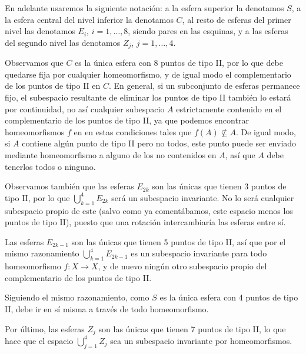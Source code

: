 \documentclass[twoside]{article}
\begin{document}
\begin{solucion}
En adelante usaremos la siguiente notación: a la esfera superior la denotamos $S$, a la esfera central del nivel inferior la denotamos $C$, al resto de esferas del primer nivel las denotamos $E_i$, $i=1,\dots, 8$, siendo pares en las esquinas, y a las esferas del segundo nivel las denotamos $Z_j$, $j=1,\dots, 4$. 

Observamos que $C$ es la única esfera con 8 puntos de tipo II, por lo que debe quedarse fija por cualquier homeomorfismo, y de igual modo el complementario de los puntos de tipo II en $C$. En general, si un subconjunto de esferas permanece fijo, el subespacio resultante de eliminar los puntos de tipo II también lo estará por continuidad, no así cualquier subespacio $A$ estrictamente contenido en el complementario de los puntos de tipo II, ya que podemos encontrar homeomorfismos $f$ en en estas condiciones tales que $f(A)\not\subseteq A$. De igual modo, si $A$ contiene algún punto de tipo II pero no todos, este punto puede ser enviado mediante homeomorfismo a alguno de los no contenidos en $A$, así que $A$ debe tenerlos todos o ninguno. 

Observamos también que las esferas $E_{2k}$ son las únicas que tienen 3 puntos de tipo II, por lo que $\bigcup_{k=1}^4E_{2k}$ será un subespacio invariante. No lo será cualquier subespacio propio de este (salvo como ya comentábamos, este espacio menos los puntos de tipo II), puesto que una rotación intercambiaría las esferas entre sí. 

Las esferas $E_{2k-1}$ son las únicas que tienen 5 puntos de tipo II, así que por el mismo razonamiento $\bigcup_{k=1}^4E_{2k-1}$ es un subespacio invariante para todo homeomorfismo $f:X\to X$, y de nuevo ningún otro subespacio propio del complementario de los puntos de tipo II. 

Siguiendo el mismo razonamiento, como $S$ es la única esfera con 4 puntos de tipo II, debe ir en sí misma a través de todo homeomorfismo. 

Por último, las esferas $Z_j$ son las únicas que tienen 7 puntos de tipo II, lo que hace que el espacio $\bigcup_{j=1}^4Z_j$ sea un subespacio invariante por homeomorfismos. 


\end{solucion}
\end{document}
